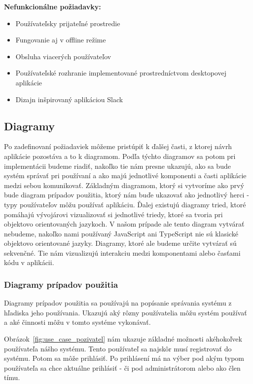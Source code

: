 \textbf{Nefunkcionálne požiadavky:}
\indent\begin{itemize}
    \item Používateľsky prijateľné prostredie
    \item Fungovanie aj v offline režime
    \item Obsluha viacerých používateľov
    \item Používateľské rozhranie implementované prostredníctvom desktopovej aplikácie
    \item Dizajn inšpirovaný aplikáciou Slack
\end{itemize}

\subsection{Diagramy}
\indent Po zadefinovaní požiadaviek môžeme pristúpiť k ďalšej časti, z ktorej návrh aplikácie pozostáva a to k diagramom. Podľa týchto diagramov sa potom pri implementácii budeme riadiť, nakoľko tie nám presne ukazujú, ako sa bude systém správať pri používaní a ako majú jednotlivé komponenti a časti aplikácie medzi sebou komunikovať. Základným diagramom, ktorý si vytvoríme ako prvý bude diagram prípadov použitia, ktorý nám buďe ukazovať ako jednotlivý herci - typy používateľov môžu používať aplikáciu. Ďalej existujú diagramy tried, ktoré pomáhajú vývojárovi vizualizovať si jednotlivé triedy, ktoré sa tvoria pri objektovo orientovaných jazykoch. V našom prípade ale tento diagram vytvárať nebudeme, nakoľko nami používaný JavaScript ani TypeScript nie sú klasické objektovo orientované jazyky. Diagramy, ktoré ale budeme určite vytvárať sú sekvenčné. Tie nám vizualizujú interakciu medzi komponentami alebo časťami kódu v aplikácii.

\subsubsection{Diagramy prípadov použitia}
\indent Diagramy prípadov použitia sa používajú na popísanie správania systému z hľadiska jeho používania. Ukazujú aký rôzny používatelia môžu systém používať a aké činnosti môžu v tomto systéme vykonávať.

\indent Obrázok~\ref{fig:use_case_pozivatel} nám ukazuje základné možnosti akéhokoľvek používateľa nášho systému. Tento používateľ sa najskôr musí registrovať do systému. Potom sa môže prihlásiť. Po prihlásení má na výber pod akým typom používateľa sa chce aktuálne prihlásiť - či pod administrátorom alebo ako člen tímu. 

